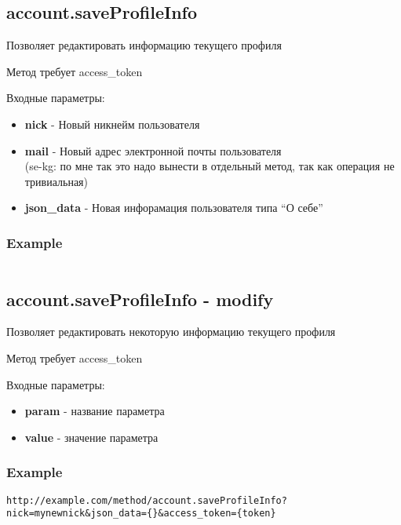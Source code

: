 \subsection{account.saveProfileInfo}
Позволяет редактировать информацию текущего профиля

Метод требует access\_token

Входные параметры:
\begin{itemize}
  \item \textbf{nick} - Новый никнейм пользователя
  \item \textbf{mail} - Новый адрес электронной почты пользователя\\
  (se-kg: по мне так это надо вынести в отдельный метод, так как операция не тривиальная)
  \item \textbf{json\_data} - Новая инфорамация пользователя типа “О себе”
\end{itemize}

\subsubsection{Example}
\begin{Verbatim}[frame=single]

\end{Verbatim}

\subsection{account.saveProfileInfo - modify}
Позволяет редактировать некоторую информацию текущего профиля

Метод требует access\_token

Входные параметры:
\begin{itemize}
  \item \textbf{param} - название параметра
  \item \textbf{value} - значение параметра
\end{itemize}

\subsubsection{Example}
\begin{Verbatim}[frame=single]
http://example.com/method/account.saveProfileInfo?nick=mynewnick&json_data={}&access_token={token}
\end{Verbatim}
